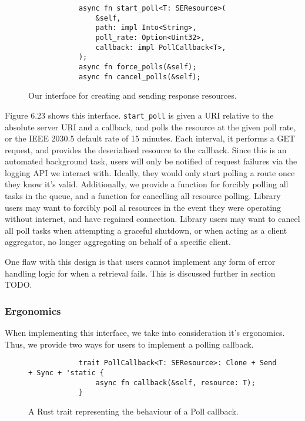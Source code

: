\begin{figure}[h]
    \begin{center}
        \begin{lstlisting}
            async fn start_poll<T: SEResource>(
                &self,
                path: impl Into<String>,
                poll_rate: Option<Uint32>,
                callback: impl PollCallback<T>,
            );
            async fn force_polls(&self);
            async fn cancel_polls(&self);
        \end{lstlisting}
        \label{fig:pollinterface}
        \vspace{-10pt}
        \caption{Our interface for creating and sending response resources.}
    \end{center}
\end{figure}

Figure 6.23 shows this interface. \texttt{start\_poll} is given a URI relative to the absolute server URI and a callback, and polls the resource at the given poll rate, or the IEEE 2030.5 default rate of 15 minutes. Each interval, it performs a GET request, and provides the deserialised resource to the callback. Since this is an automated background task, users will only be notified of request failures via the logging API we interact with. Ideally, they would only start polling a route once they know it's valid.
Additionally, we provide a function for forcibly polling all tasks in the queue, and a function for cancelling all resource polling. Library users may want to forcibly poll al resources in the event they were operating without internet, and have regained connection. Library users may want to cancel all poll tasks when attempting a graceful shutdown, or when acting as a client aggregator, no longer aggregating on behalf of a specific client. 

One flaw with this design is that users cannot implement any form of error handling logic for when a retrieval fails. This is discussed further in section TODO.

\subsubsection{Ergonomics}
When implementing this interface, we take into consideration it's ergonomics. Thus, we provide two ways for users to implement a polling callback.


\begin{figure}[h]
    \begin{center}
        \begin{lstlisting}
            trait PollCallback<T: SEResource>: Clone + Send + Sync + 'static {
                async fn callback(&self, resource: T);
            }
        \end{lstlisting}
        \label{fig:polltrait}
        \vspace{-10pt}
        \caption{A Rust trait representing the behaviour of a Poll callback.}
    \end{center}
\end{figure}

